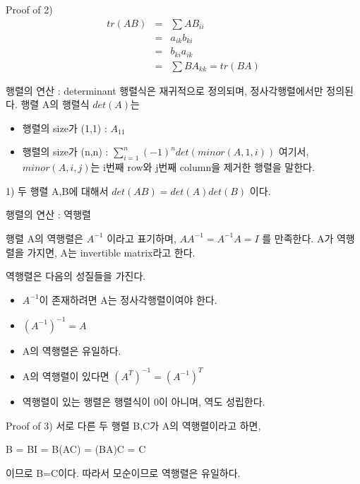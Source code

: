 \documentclass{beamer}
\begin{document}
\begin{frame}{Proof of 2)} 
\begin{eqnarray}
tr(AB) &=& \sum AB_{ii} \\
&=& a_{ik}b_{ki} \\
&=& b_{ki}a_{ik} \\
&=& \sum BA_{kk} = tr(BA)
\end{eqnarray}
\end{frame}



\begin{frame}{행렬의 연산 : determinant} 
행렬식은 재귀적으로 정의되며, 정사각행렬에서만 정의된다. 행렬 A의 행렬식 $det(A)$는 
\begin{itemize} 
\item 행렬의 size가 (1,1) : $A_{11}$
\item 행렬의 size가 (n,n) : $\sum^{n}_{i=1}(-1)^n det(minor(A, 1, i))$
여기서, $minor(A, i, j)$는 i번째 row와 j번째 column을 제거한 행렬을 말한다. 
\end{itemize}

1) 두 행렬 A,B에 대해서 $det(AB) = det(A) det(B)$ 이다. 
\end{frame}


\begin{frame}{행렬의 연산 : 역행렬} 

행렬 A의 역행렬은 $A^{-1}$ 이라고 표기하며, $AA^{-1} = A^{-1}A = I$ 를 만족한다. A가 역행렬을 가지면, A는 invertible matrix라고 한다. 

역행렬은 다음의 성질들을 가진다. 

\begin{itemize} 
\item $A^{-1}$이 존재하려면 A는 정사각행렬이여야 한다. 
\item $(A^{-1})^{-1} = A$
\item A의 역행렬은 유일하다. 
\item A의 역행렬이 있다면 $(A^T)^{-1} = (A^{-1})^T$
\item 역행렬이 있는 행렬은 행렬식이 0이 아니며, 역도 성립한다. 
\end{itemize} 

\end{frame}

\begin{frame}{Proof of 3)}
서로 다른 두 행렬 B,C가 A의 역행렬이라고 하면, 

B = BI = B(AC) = (BA)C = C 

이므로 B=C이다. 따라서 모순이므로 역행렬은 유일하다. 
\end{frame}
\end{document}
